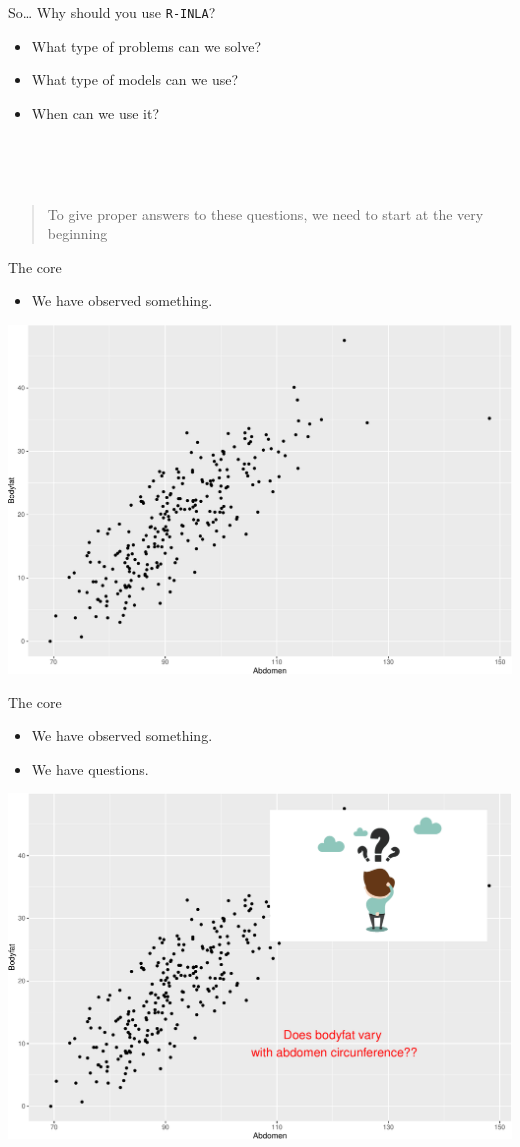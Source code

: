 \documentclass[
  ignorenonframetext,
]{beamer}
\providecommand{\tightlist}{%
  \setlength{\itemsep}{0pt}\setlength{\parskip}{0pt}}
\begin{document}
\begin{frame}{So\ldots{} Why should you use \texttt{R-INLA}?}
\protect\hypertarget{so-why-should-you-use-r-inla}{}
\begin{itemize}
\tightlist
\item
  What type of problems can we solve?
\item
  What type of models can we use?
\item
  When can we use it?\\
  \strut \\
  \strut \\
\end{itemize}

\begin{quote}
To give proper answers to these questions, we need to start at the very
beginning
\end{quote}
\end{frame}

\begin{frame}{The core}
\protect\hypertarget{the-core}{}
\begin{itemize}
\tightlist
\item
  We have observed something.
\end{itemize}

\begin{center}\includegraphics[width=0.6\linewidth]{Part1_intro_files/figure-beamer/unnamed-chunk-2-1} \end{center}
\end{frame}

\begin{frame}{The core}
\protect\hypertarget{the-core-1}{}
\begin{itemize}
\tightlist
\item
  We have observed something.
\item
  We have questions.
\end{itemize}

\begin{center}\includegraphics[width=0.6\linewidth]{Part1_intro_files/figure-beamer/unnamed-chunk-3-1} \end{center}
\end{frame}
\end{document}
